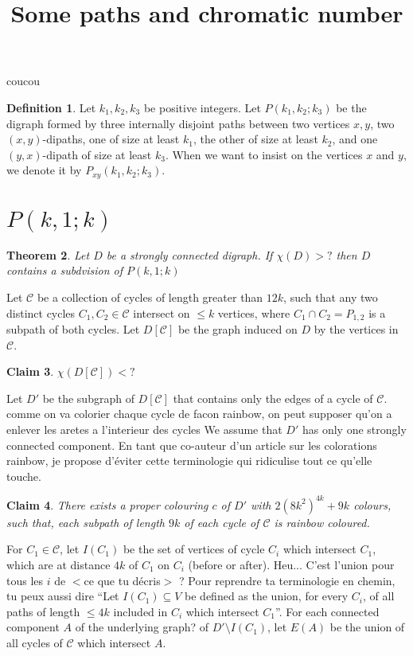 \documentclass[utf8,10pt]{article}
\title{Some paths and chromatic number}
\theoremstyle{plain}
\newtheorem{theorem}{Theorem}
\newtheorem{claim}[theorem]{Claim}
\theoremstyle{definition}
\newtheorem{definition}[theorem]{Definition}
\theoremstyle{remark}
\newcommand{\william}[1]{{\color{red}{\bf William:} #1}}
\newcommand{\nathann}[1]{{\color{blue}{\bf Nathann:} #1}}
\begin{document}
coucou

\begin{definition}
Let $k_1,k_2,k_3$ be positive integers. Let $P(k_1,k_2;k_3)$ be the digraph formed by three internally disjoint paths between two vertices $x,y$, two $(x,y)$-dipaths, one of size at least $k_1$, the other of size at least $k_2$, and one $(y,x)$-dipath of size at least $k_3$.
When we want to insist on the vertices $x$ and $y$, we denote it by $P_{xy}(k_1,k_2;k_3)$.
\end{definition}




\section{$P(k,1;k)$}

\begin{theorem}
Let $D$ be a strongly connected digraph. If $\chi(D) > ?$ then $D$ contains a subdvision of $P(k,1;k)$
\end{theorem}

Let $\mathcal{C}$ be a collection of cycles of length greater than $12k$, such
that any two distinct cycles $C_1,C_2\in\mathcal C$ intersect on $\leq k$
vertices, where $C_1\cap C_2=P_{1,2}$ is a subpath of both cycles.  Let $D[\mathcal{C}]$ be
the graph induced on $D$ by the vertices in $\mathcal{C}$.

\begin{claim}\label{DC}
$\chi(D[\mathcal{C}]) < ? $
\end{claim}

Let $D'$ be the subgraph of $D[\mathcal{C}]$ that contains only the edges of a cycle of  $\mathcal{C}$.
\william{comme on va colorier chaque cycle de facon rainbow, on peut supposer qu'on a enlever les aretes a l'interieur des cycles}
We assume that $D'$ has only one strongly connected component.
\nathann{En tant que co-auteur d'un article sur les colorations rainbow, je propose d'éviter cette terminologie qui ridiculise tout ce qu'elle touche.}


\begin{claim}
There exists a proper colouring $c$ of $D'$ with $2(8k^2)^{4k} + 9k$ colours, such that, each subpath of length $9k$ of each cycle of $\mathcal{C}$ is rainbow coloured.
\end{claim}

For $C_1\in \mathcal{C}$, let $I(C_1)$ be the set of vertices of cycle $C_i$ which intersect $C_1$, which are at distance $4k$
of $C_1$ on $C_i$ (before or after).
\nathann{Heu... C'est l'union pour tous les $i$ de $<$ce que tu décris$>$ ? Pour reprendre ta terminologie en chemin, tu peux aussi dire ``Let $I(C_1)\subseteq V$ be defined as the union, for every $C_i$, of all paths of length $\leq 4k$ included in $C_i$ which intersect $C_1$''.}
For each connected component $A$ \nathann{of the underlying graph?}
of $D'\setminus I(C_1)$, let $E(A)$ be the union of all cycles of $\mathcal{C}$ which intersect $A$.
\end{document}
